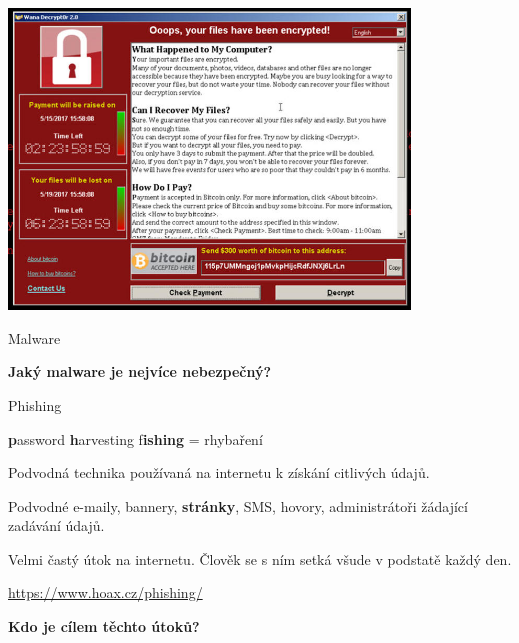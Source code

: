 \documentclass[aspectratio=1610]{beamer}
\begin{document}
\begin{frame}
    \begin{center}
        \includegraphics[width=0.8\textwidth]{img/ransomware.jpg}
    \end{center}
\end{frame}

\begin{frame}{Malware}
    \begin{cardTiny}
        \begin{center}
            \textbf{Jaký malware je nejvíce nebezpečný?}
        \end{center}
    \end{cardTiny}
\end{frame}

\begin{frame}{Phishing}
    \begin{cardTiny}
        \begin{flushleft}
            \textbf{p}assword \textbf{h}arvesting f\textbf{ishing} = rhybaření

            \vspace{2ex}

            Podvodná technika používaná na internetu k získání citlivých údajů.

            Podvodné e-maily, bannery, \textbf{stránky}, SMS, hovory, administrátoři žádající zadávání údajů.

            \vspace{2ex}
            Velmi častý útok na internetu. Člověk se s ním setká všude v podstatě každý den.

            \vspace{2ex}
            \href{https://www.hoax.cz/phishing/}{https://www.hoax.cz/phishing/}
        \end{flushleft}
    \end{cardTiny}
    \begin{cardTiny}
        \begin{center}
            \textbf{Kdo je cílem těchto útoků?}
        \end{center}
    \end{cardTiny}
\end{frame}
\end{document}
